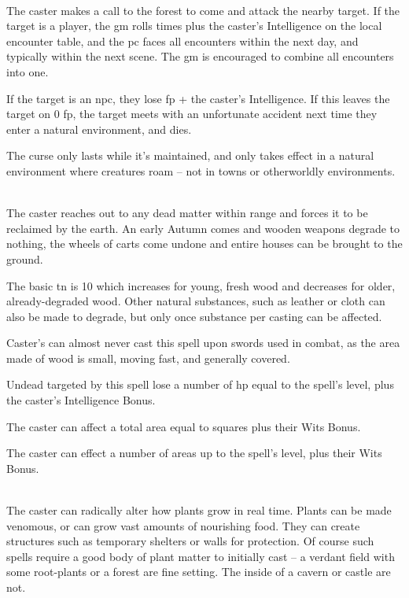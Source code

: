 \documentclass[titlepage,a4paper,openany]{book}
\begin{document}
\begin{multicols}{2}
\\
The caster makes a call to the forest to come and attack the nearby target.  If the target is a player, the \gls{gm} rolls  times plus the caster's Intelligence on the local encounter table, and the \gls{pc} faces all encounters within the next day, and typically within the next scene.  The \gls{gm} is encouraged to combine all encounters into one.

If the target is an \gls{npc}, they lose  \gls{fp} + the caster's Intelligence.  If this leaves the target on 0 \gls{fp}, the target meets with an unfortunate accident next time they enter a natural environment, and dies.

The curse only lasts while it's maintained, and only takes effect in a natural environment where creatures roam -- not in towns or otherworldly environments.

\\
The caster reaches out to any dead matter within range and forces it to be reclaimed by the earth. An early Autumn comes and wooden weapons degrade to nothing, the wheels of carts come undone and entire houses can be brought to the ground.

The basic \gls{tn} is 10 which increases for young, fresh wood and decreases for older, already-degraded wood. Other natural substances, such as leather or cloth can also be made to degrade, but only once substance per casting can be affected.

Caster's can almost never cast this spell upon swords used in combat, as the area made of wood is small, moving fast, and generally covered.

Undead targeted by this spell lose a number of \gls{hp} equal to the spell's level, plus the caster's Intelligence Bonus.


The caster can affect a total area equal to  squares plus their Wits Bonus. 


The caster can effect a number of areas up to the spell's level, plus their Wits Bonus.

\spelllevel

\\
The caster can radically alter how plants grow in real time. Plants can be made venomous, or can grow vast amounts of nourishing food. They can create structures such as temporary shelters or walls for protection. Of course such spells require a good body of plant matter to initially cast -- a verdant field with some root-plants or a forest are fine setting. The inside of a cavern or castle are not.


\end{multicols}
\end{document}
